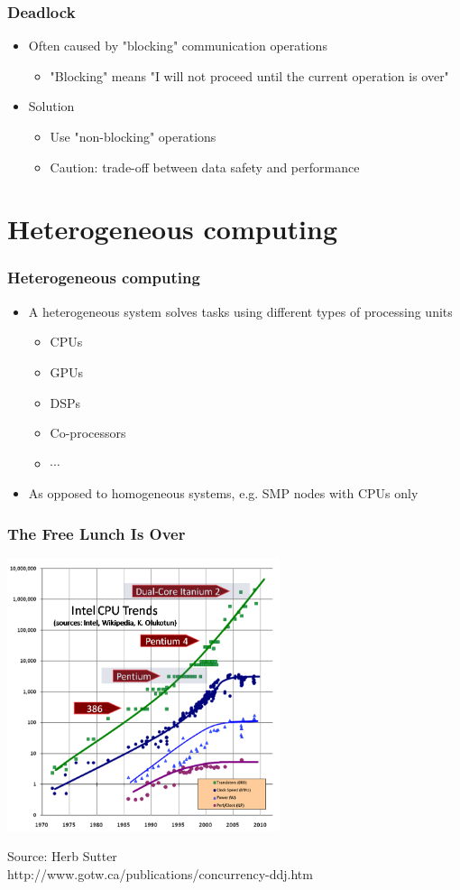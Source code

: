 \documentclass[10pt,t]{beamer}
\begin{document}
\begin{frame}
\frametitle{Deadlock}
\begin{itemize}
\item Often caused by "blocking" communication operations
\begin{itemize}
\item "Blocking" means "I will not proceed until the current operation is over"
\end{itemize}
\item Solution
\begin{itemize}
\item Use "non-blocking" operations
\item Caution: trade-off between data safety and performance
\end{itemize}
\end{itemize}
\end{frame}


\section{Heterogeneous computing}
\begin{frame}
\frametitle{Heterogeneous computing}
\begin{itemize}
\item A heterogeneous system solves tasks using different types of processing units
\begin{itemize}
\item CPUs
\item GPUs
\item DSPs
\item Co-processors
\item $\cdots$
\end{itemize}
\item As opposed to homogeneous systems, e.g. SMP nodes with CPUs only
\end{itemize}
\end{frame}

\begin{frame}
\frametitle{The Free Lunch Is Over}
\begin{center}
\includegraphics[width=0.6\textwidth]{CPUTrend}


\tiny{Source: Herb Sutter\\
http://www.gotw.ca/publications/concurrency-ddj.htm}
\end{center}
\end{frame}
\end{document}
